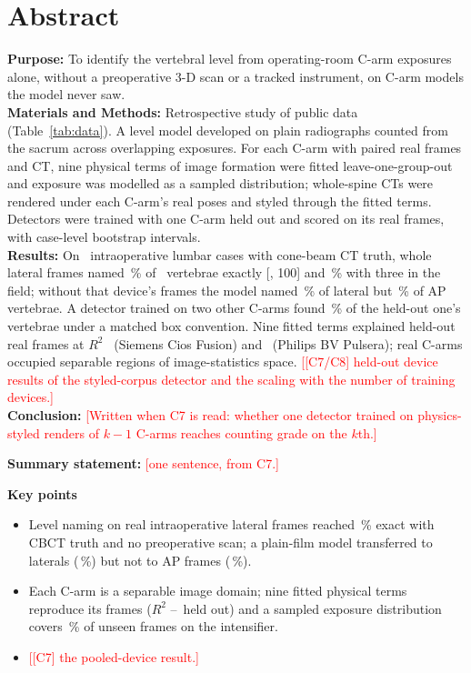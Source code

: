 \documentclass[11pt,letterpaper]{article}
\newcommand{\todo}[1]{\textcolor{red}{[#1]}}
\newcommand{\ci}[2]{[#1, #2]}
\begin{document}
\section*{Abstract}
\noindent\textbf{Purpose:} To identify the vertebral level from operating-room C-arm exposures alone, without a preoperative 3-D scan or a tracked instrument, on C-arm models the model never saw.\\
\noindent\textbf{Materials and Methods:} Retrospective study of public data (Table~\ref{tab:data}). A level model developed on plain radiographs counted from the sacrum across overlapping exposures. For each C-arm with paired real frames and CT, nine physical terms of image formation were fitted leave-one-group-out and exposure was modelled as a sampled distribution; whole-spine CTs were rendered under each C-arm's real poses and styled through the fitted terms. Detectors were trained with one C-arm held out and scored on its real frames, with case-level bootstrap intervals.\\
\noindent\textbf{Results:} On \clCarmCvFiveFrames\ intraoperative lumbar cases with cone-beam CT truth, whole lateral frames named \clCarmCvFiveLatWholeExact\,\% of \clCarmCvFiveLatWholeVertebrae\ vertebrae exactly \ci{\clCarmCvFiveLatWholeCiLo}{100} and \clCarmCvFiveLatKThreeExact\,\% with three in the field; without that device's frames the model named \clCarmZeroshotLatWholeExact\,\% of lateral but \clCarmZeroshotApWholeExact\,\% of AP vertebrae. A detector trained on two other C-arms found \clLodoCarmHeldoutVertOutlineZeroTwoFive\,\% of the held-out one's vertebrae under a matched box convention. Nine fitted terms explained held-out real frames at $R^2$ \clCardCiosRTwoHeldout\ (Siemens Cios Fusion) and \clCardPulseraRTwoHeldout\ (Philips BV Pulsera); real C-arms occupied separable regions of image-statistics space. \todo{[C7/C8] held-out device results of the styled-corpus detector and the scaling with the number of training devices.}\\
\noindent\textbf{Conclusion:} \todo{Written when C7 is read: whether one detector trained on physics-styled renders of $k-1$ C-arms reaches counting grade on the $k$th.}

\medskip
\noindent\textbf{Summary statement:} \todo{one sentence, from C7.}

\medskip
\noindent\textbf{Key points}
\begin{itemize}\setlength\itemsep{0pt}
\item Level naming on real intraoperative lateral frames reached \clCarmCvFiveLatWholeExact\,\% exact with CBCT truth and no preoperative scan; a plain-film model transferred to laterals (\clCarmZeroshotLatWholeExact\,\%) but not to AP frames (\clCarmZeroshotApWholeExact\,\%).
\item Each C-arm is a separable image domain; nine fitted physical terms reproduce its frames ($R^2$ \clCardCiosRTwoHeldout--\clCardPulseraRTwoHeldout\ held out) and a sampled exposure distribution covers \clCardPulseraTypicalityNineNine\,\% of unseen frames on the intensifier.
\item \todo{[C7] the pooled-device result.}
\end{itemize}
\end{document}
